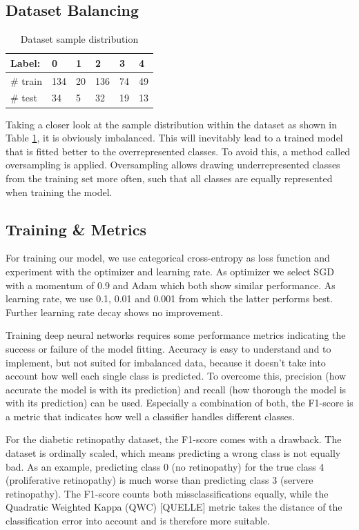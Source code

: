 \documentclass{article}
\begin{document}
\subsection{Dataset Balancing}
\renewcommand{\arraystretch}{1.2}
\begin{table}
  \vspace{-15pt}
  \centering
  \begin{tabular}{|l|l|l|l|l|l|}
  \hline
  Label:   & 0   & 1  & 2   & 3  & 4  \\ \hline \hline
  \# train & 134 & 20 & 136 & 74 & 49 \\ \hline
  \# test  & 34  & 5  & 32  & 19 & 13 \\ \hline
  \end{tabular}
  \caption{Dataset sample distribution} \label{tab:table1}
  \end{table}
Taking a closer look at the sample distribution within the dataset as shown in Table \ref{tab:table1}, it is obviously imbalanced. This will inevitably lead to a trained model
that is fitted better to the overrepresented classes.
To avoid this, a method called oversampling is applied. Oversampling allows drawing underrepresented classes from the training set more often, 
such that all classes are equally represented when training the model.
\pagebreak
\subsection{Training \& Metrics}
For training our model, we use categorical cross-entropy as loss function and experiment with the optimizer and 
learning rate. As optimizer we select SGD with a momentum of 0.9 and Adam which both show similar performance. 
As learning rate, we use 0.1, 0.01 and 0.001 from which the latter performs best. Further learning rate decay
shows no improvement.

Training deep neural networks requires some performance metrics indicating the success or failure of the model fitting. Accuracy
is easy to understand and to implement, but not suited for imbalanced data, because it doesn't take into account how well each 
single class is predicted. 
To overcome this, precision (how accurate the model is with its prediction) and recall (how thorough the model is with its prediction) can be used. 
Especially a combination of both, the F1-score is a metric that indicates how well a classifier handles different classes.

For the diabetic retinopathy dataset, the F1-score comes with a drawback. The dataset is ordinally scaled, which means predicting 
a wrong class is not equally bad. As an example, predicting class 0 (no retinopathy) for the true class 4 (proliferative retinopathy) 
is much worse than predicting class 3 (servere retinopathy). The F1-score counts both missclassifications equally, while the 
Quadratic Weighted Kappa (QWC) [QUELLE] metric takes the distance of the classification error into account and is therefore more suitable.
\end{document}
